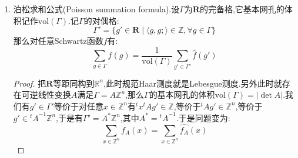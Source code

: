 \begin{enumerate}
\begin{proof}
    	(1):按照$h(x)=\prod_{1\le i\le n}e^{-\pi x_i^2}$和$\widehat{h}(x)=\prod_{1\le i\le n}\widehat{(e^{-\pi x_i^2})}$,归结为设$n=1$.此时对$\widehat{h}(y)$求导有:
    	$$\frac{\mathrm{d}}{\mathrm{d}y}\widehat{h}(y)=-2\pi i\int_{\mathbb{R}}xh(x)e^{-2\pi ixy}\mathrm{d}x=-2\pi y\widehat{h}(y)$$	
    	于是有$\widehat{h}(y)=Ce^{-\pi y^2}$.带入$y=0$结合$\int_{\mathbb{R}}e^{-\pi x^2}\mathrm{d}x=1$得到$C=1$.(2)是因为:
    	\begin{align*}
    		\widehat{f_A}(y)&=\int_{\textbf{R}}f(Ax)e^{-2\pi i\langle x,y\rangle}\mathrm{d}x\\&=\int_{\textbf{R}}f(x)e^{-2\pi i\langle A^{-1}x,y\rangle}|\det A|^{-1}\mathrm{d}x\\&=\frac{1}{|\det A|}\int_{\textbf{R}}f(x)e^{-2\pi i\langle x,{^tA}^{-1}y\rangle}\mathrm{d}x\\&=\frac{1}{|\det A|}\widehat{f}({^tA}^{-1}y)
    	\end{align*}
    \end{proof}
    \item 泊松求和公式(Poisson summation formula).设$\Gamma$为$\textbf{R}$的完备格,它基本网孔的体积记作$\mathrm{vol}(\Gamma)$.记$\Gamma$的对偶格:
    $$\Gamma'=\{g'\in\textbf{R}\mid\langle g,g;\rangle\in\mathbb{Z},\forall g\in\Gamma\}$$
    那么对任意Schwartz函数$f$有:
    $$\sum_{g\in\Gamma}f(g)=\frac{1}{\mathrm{vol}(\Gamma)}\sum_{g'\in\Gamma'}\widehat{f}(g')$$
    \begin{proof}
    	
    	把$\textbf{R}$等距同构到$\mathbb{R}^n$,此时规范Haar测度就是Lebesgue测度.另外此时就存在可逆线性变换$A$满足$\Gamma=A\mathbb{Z}^n$,那么$\Gamma$的基本网孔的体积$\mathrm{vol}(\Gamma)=|\det A|$.我们有$g'\in\Gamma'$等价于对任意$x\in\mathbb{Z}^n$有${^tx}{^tA}g'\in\mathbb{Z}$,等价于${^tA}g'\in\mathbb{Z}^n$,等价于$g'\in{^tA}^{-1}\mathbb{Z}^n$,于是有$\Gamma'=A^*\mathbb{Z}^n$,其中$A^*={^tA}^{-1}$.于是问题变为:
    	$$\sum_{x\in\mathbb{Z}^n}f_A(x)=\sum_{x\in\mathbb{Z}^n}\widehat{f_A}(x)$$
    	

\end{proof}
\end{enumerate}
